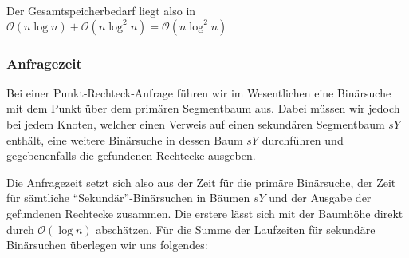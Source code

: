 \documentclass[a4paper]{article}
\begin{document}
Der Gesamtspeicherbedarf liegt also in $\mathcal{O}(n \log n) + \mathcal{O}(n \log^2 n)
	= \mathcal{O}(n \log^2 n)$
\subsubsection*{Anfragezeit}
Bei einer Punkt-Rechteck-Anfrage führen wir im Wesentlichen eine Binärsuche mit dem Punkt über 
dem primären Segmentbaum aus. Dabei müssen wir jedoch bei jedem Knoten, welcher einen Verweis
auf einen sekundären Segmentbaum $sY$ enthält, eine weitere Binärsuche in dessen Baum $sY$ durchführen
und gegebenenfalls die gefundenen Rechtecke ausgeben. 

Die Anfragezeit setzt sich also aus der Zeit für die primäre Binärsuche, der Zeit für 
sämtliche "`Sekundär"'-Binärsuchen in Bäumen $sY$ und der Ausgabe der gefundenen
Rechtecke zusammen. Die erstere lässt sich mit der 
Baumhöhe direkt durch $\mathcal{O}(\log n)$ abschätzen. Für die Summe der Laufzeiten für 
sekundäre Binärsuchen überlegen wir uns folgendes:
\end{document}
